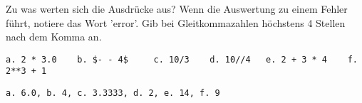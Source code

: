 \question[3]
Zu was werten sich die Ausdrücke aus? Wenn die Auswertung zu einem Fehler führt, notiere das
Wort 'error'. Gib bei Gleitkommazahlen höchstens 4 Stellen nach dem Komma an.

\begin{lstlisting}
a. 2 * 3.0    b. $- - 4$     c. 10/3    d. 10//4   e. 2 + 3 * 4    f. 2**3 + 1
\end{lstlisting}
\begin{solutionbox}{2cm}
\begin{lstlisting}
a. 6.0, b. 4, c. 3.3333, d. 2, e. 14, f. 9
\end{lstlisting}
\end{solutionbox}
